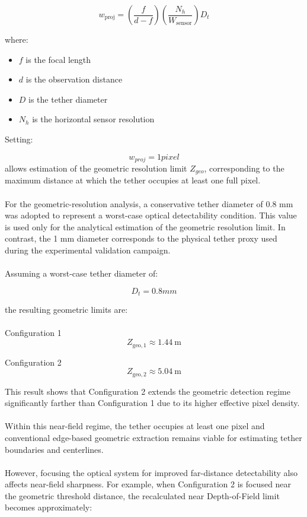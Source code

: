 \begin{equation*}
w_{\mathrm{proj}} =
\left(\frac{f}{d - f}\right)
\left(\frac{N_h}{W_{\mathrm{sensor}}}\right)
D_t
\label{eq:projected-width}
\end{equation*}

\newpage
\clearpage
where:
\begin{itemize}
    \item $f$ is the focal length
    \item $d$ is the observation distance
    \item $D$ is the tether diameter
    \item $N_h$ is the horizontal sensor resolution
\end{itemize}

Setting:

\[
w_{proj} = 1 pixel
\]
allows estimation of the geometric resolution limit $Z_{geo}$, corresponding to the maximum distance at which the tether occupies at least one full pixel.
\\\\
For the geometric-resolution analysis, a conservative tether diameter of 0.8 mm was adopted to represent a worst-case optical detectability condition. This value is used only for the analytical estimation of the geometric resolution limit. In contrast, the 1 mm diameter corresponds to the physical tether proxy used during the experimental validation campaign.
\\\\
Assuming a worst-case tether diameter of:

\[
D_t = 0.8 mm
\]

the resulting geometric limits are:
\\\\
Configuration 1
\[
Z_{\mathrm{geo,1}} \approx 1.44~\mathrm{m}
\]

Configuration 2
\[
Z_{\mathrm{geo,2}} \approx 5.04~\mathrm{m}
\]

This result shows that Configuration 2 extends the geometric detection regime significantly farther than Configuration 1 due to its higher effective pixel density.
\\\\
Within this near-field regime, the tether occupies at least one pixel and conventional edge-based geometric extraction remains viable for estimating tether boundaries and centerlines.
\\\\
However, focusing the optical system for improved far-distance detectability also affects near-field sharpness. For example, when Configuration 2 is focused near the geometric threshold distance, the recalculated near Depth-of-Field limit becomes approximately:


